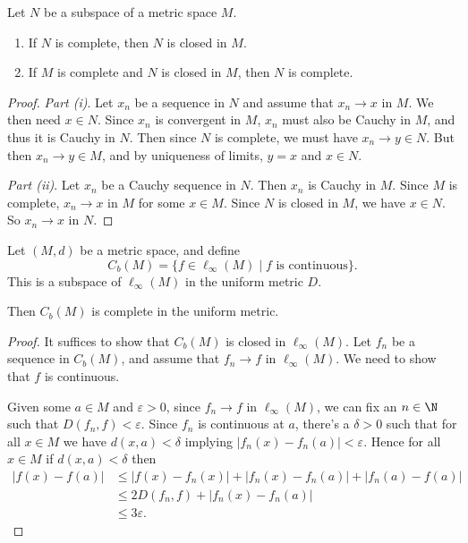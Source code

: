 \begin{proposition}
    Let $N$ be a subspace of a metric space $M$. 
    \begin{enumerate}[label=(\roman*)]
        \item If $N$ is complete, then $N$ is closed in $M$.
        \item If $M$ is complete and $N$ is closed in $M$, then $N$ is complete.
    \end{enumerate}
\end{proposition}
\begin{proof}
    \emph{Part (i)}. Let $x_n$ be a sequence in $N$ and assume that $x_n \rightarrow x$ in $M$. We then need $x \in N$. Since $x_n$ is convergent in $M$, $x_n$ must also be Cauchy in $M$, and thus it is Cauchy in $N$. Then since $N$ is complete, we must have $x_n \rightarrow y \in N$. But then $x_n \rightarrow y \in M$, and by uniqueness of limits, $y = x$ and $x \in N$.

    \emph{Part (ii)}. Let $x_n$ be a Cauchy sequence in $N$. Then $x_n$ is Cauchy in $M$. Since $M$ is complete, $x_n \rightarrow x$ in $M$ for some $x \in M$. Since $N$ is closed in $M$, we have $x \in N$. So $x_n \rightarrow x$ in $N$.
\end{proof}

\begin{theorem}
    Let $(M, d)$ be a metric space, and define
    $$
    C_b(M) = \{f \in \ell_{\infty}(M) \mid f \text{ is continuous} \}.
    $$
    This is a subspace of $\ell_{\infty}(M)$ in the uniform metric $D$.

    Then $C_b(M)$ is complete in the uniform metric.
\end{theorem}
\begin{proof}
It suffices to show that $C_b(M)$ is closed in $\ell_{\infty}(M)$. Let $f_n$ be a sequence in $C_b(M)$, and assume that $f_n \rightarrow f$ in $\ell_{\infty}(M)$. We need to show that $f$ is continuous.

Given some $a \in M$ and $\varepsilon > 0$, since $f_n \rightarrow f$ in $\ell_{\infty}(M)$, we can fix an $n \in \N$ such that $D(f_n, f) < \varepsilon$.
Since $f_n$ is continuous at $a$, there's a $\delta > 0$ such that for all $x \in M$ we have $d(x, a) < \delta$ implying $|f_n(x) - f_n(a)| < \varepsilon$. Hence for all $x \in M$ if $d(x,a) < \delta$ then
\begin{align*}
    |f(x) - f(a)| &\leq |f(x) - f_n(x)| + |f_n(x) - f_n(a)| + |f_n(a) - f(a)|  \\
    &\leq 2D(f_n, f) + |f_n(x) - f_n(a)|  \\
    & \leq 3\varepsilon.
\end{align*}
\end{proof}


